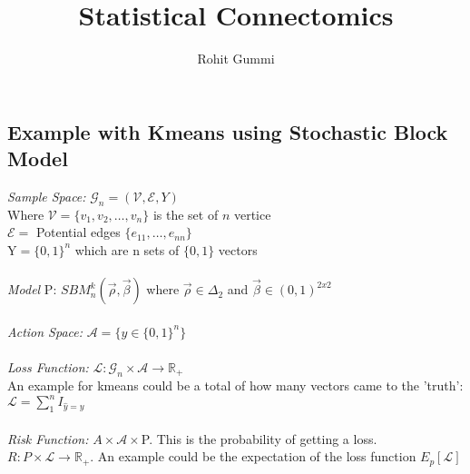 \documentclass[12pt]{article}
\begin{document}
\title{Statistical Connectomics}
\author{Rohit Gummi}
\maketitle
\subsection*{Example with Kmeans using Stochastic Block Model}
\emph{Sample Space:} $\mathcal{G}_n=(\mathcal{V},\mathcal{E},Y)$
\\Where $\mathcal{V}=\{v_1,v_2,\ldots,v_n\}$ is the set of $n$ vertice
\\$\mathcal{E}=$ Potential edges $\{e_{11},\ldots,e_{nn}\}$
\\Y$=\{0,1\}^n$ which are n sets of $\{0,1\}$ vectors
\\
\\
\emph{Model} P: $SBM_n^k (\vec \rho,\vec\beta)$ where $\vec \rho \in \Delta_2$ and $\vec \beta \in (0,1)^{2x2}$
\\
\\
\emph{Action Space:} $\mathcal{A}=\{y \in \{0,1\}^n\}$
\\
\\
\emph{Loss Function:} $\mathcal{L}:\mathcal{G}_n \times \mathcal{A} \to \mathbb{R}_+$
\\An example for kmeans could be a total of how many vectors came to the 'truth':\\ $\mathcal{L}=\sum_1^n I_{\hat y=y}$
\\
\\
\emph{Risk Function:} $A \times \mathcal{A} \times $P. This is the probability of getting a loss.
\\$R:P \times \mathcal{L} \to \mathbb{R}_+$. An example could be the expectation of the loss function $E_p[\mathcal{L}]$
\end{document}
